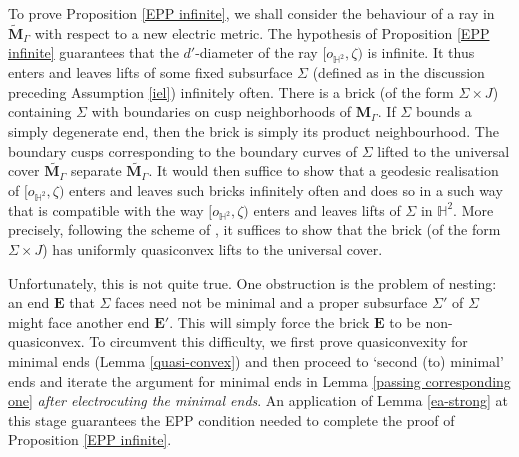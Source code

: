 \documentclass{amsart}
\theoremstyle{definition}
\newcommand\Hyp{{\mathbb H}}
\begin{document}
To prove Proposition \ref{EPP infinite}, we shall consider the behaviour of a ray in  $\widetilde{\mathbf M}_\Gamma$ with respect to a new electric metric. The hypothesis of
Proposition \ref{EPP infinite} guarantees that the $d'$-diameter of the ray $[o_{\Hyp^2}, \zeta)$
is infinite. It thus enters and leaves lifts of some fixed subsurface $\Sigma$ (defined
as in the discussion preceding Assumption \ref{iel}) infinitely often. There is a brick (of the form $\Sigma \times J$)
containing  $\Sigma$  with boundaries on cusp neighborhoods
 of $\mathbf{M}_\Gamma$. If $\Sigma$ bounds a simply degenerate end, then the brick is simply its product neighbourhood.
 The boundary cusps corresponding to the boundary curves of $\Sigma$ 
 lifted to the universal cover $\widetilde{\mathbf{M}_\Gamma}$
  separate $\widetilde{\mathbf{M}_\Gamma}$. It would then
   suffice to show that
  a geodesic realisation of $[o_{\Hyp^2}, \zeta)$ enters and leaves such bricks infinitely often
  and does so in a such way that is compatible with the way $[o_{\Hyp^2}, \zeta)$
  enters and leaves lifts of  $\Sigma$ in ${\Hyp^2}$. More precisely, following the scheme
  of \cite{mahan-series2}, it suffices to show that the brick (of the form $\Sigma \times J$)
  has uniformly quasiconvex lifts to the universal cover.
  
  Unfortunately, this is not quite true. One obstruction is the problem of nesting: an end $\mathbf{E}$
  that $\Sigma$ faces need not be minimal and a proper 
  subsurface $\Sigma'$ of $\Sigma$ might face another end   $\mathbf{E}'$. This will simply force the
  brick $\mathbf{E}$ to be non-quasiconvex.
  To circumvent this difficulty, we first prove quasiconvexity for minimal ends (Lemma \ref{quasi-convex})
  and then proceed  to \lq second (to) minimal' ends and iterate  the argument for minimal ends in Lemma
  \ref{passing corresponding one} {\it after electrocuting the minimal ends}.
 An application of  Lemma \ref{ea-strong} at this stage guarantees the EPP condition needed to complete
 the proof of Proposition \ref{EPP infinite}.
\end{document}
